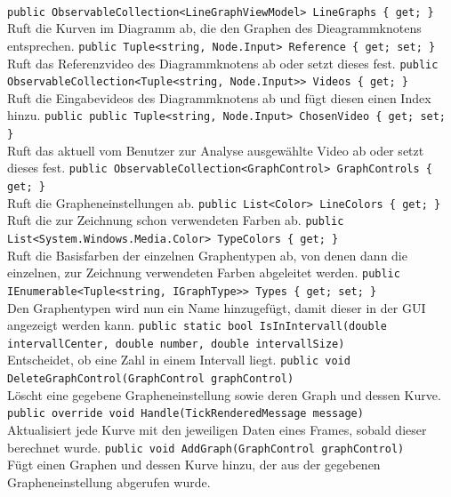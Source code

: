 \paragraph{}
\begin{itemize}
	\add \verb!public ObservableCollection<LineGraphViewModel> LineGraphs { get; }! \\
	Ruft die Kurven im Diagramm ab, die den Graphen des Dieagrammknotens entsprechen. 
	\add \verb!public Tuple<string, Node.Input> Reference { get; set; }! \\
	Ruft das Referenzvideo des Diagrammknotens ab oder setzt dieses fest.
	\add \verb!public ObservableCollection<Tuple<string, Node.Input>> Videos { get; }! \\
	Ruft die Eingabevideos des Diagrammknotens ab und fügt diesen einen Index hinzu.
	\add \verb!public public Tuple<string, Node.Input> ChosenVideo { get; set; }! \\
	Ruft das aktuell vom Benutzer zur Analyse ausgewählte Video ab oder setzt dieses fest.
	\add \verb!public ObservableCollection<GraphControl> GraphControls { get; }! \\
	Ruft die Grapheneinstellungen ab.
	\add \verb!public List<Color> LineColors { get; }! \\
	Ruft die zur Zeichnung schon verwendeten Farben ab.
	\add \verb!public List<System.Windows.Media.Color> TypeColors { get; }! \\
	Ruft die Basisfarben der einzelnen Graphentypen ab, von denen dann die einzelnen, zur Zeichnung verwendeten Farben abgeleitet werden.
	\change \verb!public IEnumerable<Tuple<string, IGraphType>> Types { get; set; }! \\
	Den Graphentypen wird nun ein Name hinzugefügt, damit dieser in der GUI angezeigt werden kann.
	\add \verb!public static bool IsInIntervall(double intervallCenter, double number, double intervallSize)! \\
	Entscheidet, ob eine Zahl in einem Intervall liegt.
	\add \verb!public void DeleteGraphControl(GraphControl graphControl)! \\
	Löscht eine gegebene Grapheneinstellung sowie deren Graph und dessen Kurve.
	\add \verb!public override void Handle(TickRenderedMessage message)! \\
	Aktualisiert jede Kurve mit den jeweiligen Daten eines Frames, sobald dieser berechnet wurde.
	\change \verb!public void AddGraph(GraphControl graphControl)! \\
	Fügt einen Graphen und dessen Kurve hinzu, der aus der gegebenen Grapheneinstellung abgerufen wurde.

\end{itemize}
